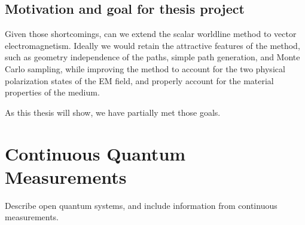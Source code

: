 \subsection{Motivation and goal for thesis project}

Given those shortcomings, can we extend the scalar worldline method to vector electromagnetism.
Ideally we would retain the attractive features of the method, such as geometry independence of the paths,
simple path generation, and Monte Carlo sampling, while improving the method to account for the two physical polarization
states of the EM field, and properly account for the material properties of the medium.  

As this thesis will show, we have partially met those goals.  


\section{Continuous Quantum Measurements}

Describe open quantum systems, and include information from continuous measurements. 

